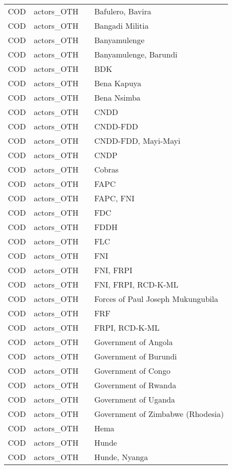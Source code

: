 \documentclass[12pt]{article}
\begin{document}
\begin{center}
\begin{longtable}{|c|c|p{7cm}|p{7cm}|}
  COD & actors\_OTH &  & Bafulero, Bavira \\ 
  COD & actors\_OTH &  & Bangadi Militia \\ 
  COD & actors\_OTH &  & Banyamulenge \\ 
  COD & actors\_OTH &  & Banyamulenge, Barundi \\ 
  COD & actors\_OTH &  & BDK \\ 
  COD & actors\_OTH &  & Bena Kapuya \\ 
  COD & actors\_OTH &  & Bena Nsimba \\ 
  COD & actors\_OTH &  & CNDD \\ 
  COD & actors\_OTH &  & CNDD-FDD \\ 
  COD & actors\_OTH &  & CNDD-FDD, Mayi-Mayi \\ 
  COD & actors\_OTH &  & CNDP \\ 
  COD & actors\_OTH &  & Cobras \\ 
  COD & actors\_OTH &  & FAPC \\ 
  COD & actors\_OTH &  & FAPC, FNI \\ 
  COD & actors\_OTH &  & FDC \\ 
  COD & actors\_OTH &  & FDDH \\ 
  COD & actors\_OTH &  & FLC \\ 
  COD & actors\_OTH &  & FNI \\ 
  COD & actors\_OTH &  & FNI, FRPI \\ 
  COD & actors\_OTH &  & FNI, FRPI, RCD-K-ML \\ 
  COD & actors\_OTH &  & Forces of Paul Joseph Mukungubila \\ 
  COD & actors\_OTH &  & FRF \\ 
  COD & actors\_OTH &  & FRPI, RCD-K-ML \\ 
  COD & actors\_OTH &  & Government of Angola \\ 
  COD & actors\_OTH &  & Government of Burundi \\ 
  COD & actors\_OTH &  & Government of Congo \\ 
  COD & actors\_OTH &  & Government of Rwanda \\ 
  COD & actors\_OTH &  & Government of Uganda \\ 
  COD & actors\_OTH &  & Government of Zimbabwe (Rhodesia) \\ 
  COD & actors\_OTH &  & Hema \\ 
  COD & actors\_OTH &  & Hunde \\ 
  COD & actors\_OTH &  & Hunde, Nyanga \\ 

\end{longtable}
\end{center}
\end{document}

